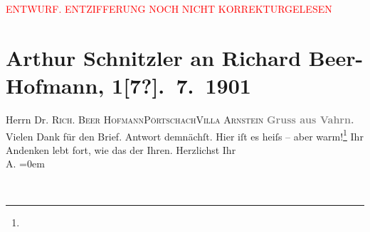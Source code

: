 
\begin{center}
            \textcolor{red}{ENTWURF. ENTZIFFERUNG NOCH NICHT KORREKTURGELESEN}
                      \end{center}
            
               \section[Arthur Schnitzler an Richard Beer-Hofmann, 1{[}7?{]}. 7. 1901]{ Arthur Schnitzler an Richard Beer-Hofmann, 1{[}7?{]}. 7. 1901}\nopagebreak{}\rehead{ }\begin{ledgroupsized}[t]{13cm}\normalsize\beginnumbering{} \toendnotes[C]{\smallbreak\pagebreak[2]} 
\pstart{}{\pb}Herrn Dr. \textsc{Rich. Beer
                            Hofmann}\pend{}\pstart{}\textsc{Pörtschach}\pend{}\pstart{}\textsc{Villa Arnstein}\pend{}{\bigskip}\pstart
           \noindent{}{\pb}\textcolor{gray}{\textbf{Gruss aus Vahrn.}}\pend
           \pstart
           Vielen Dank für den Brief. Antwort demnächſt.\pend
           \pstart
           Hier iſt es heiſs – aber warm!\footnote{} Ihr Andenken lebt fort, wie das der Ihren.\pend
           \pstart
           Herzlichst Ihr{\\[\baselineskip]}\spacefill\mbox{A.}\pend
           \leftskip=0em{}\endnumbering{}\end{ledgroupsized}  \newcommand{\dateiname}{L01148}\newcommand{\titel}{Arthur Schnitzler an Richard Beer-Hofmann, 1[7?]. 7. 1901}\newcommand{\editorInnen}{Martin Anton Müller und Gerd-Hermann Susen}
      